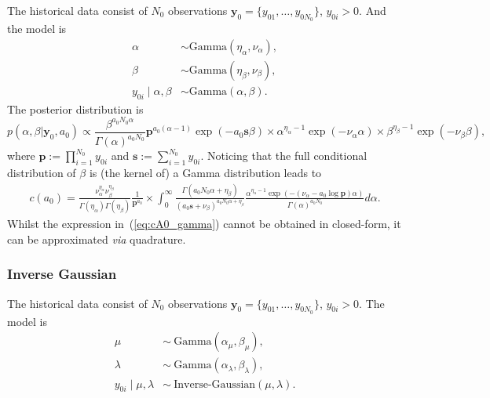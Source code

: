 \documentclass[a4paper, notitlepage, 11pt]{article}
\begin{document}
The historical data consist of $N_0$ observations $\boldsymbol y_0 =\{y_{01}, \ldots , y_{0N_0}\}$, $y_{0i} > 0$.
And the model is
\begin{align*}
 \alpha &\sim \text{Gamma}(\eta_\alpha, \nu_\alpha), \\
 \beta &\sim \text{Gamma}(\eta_\beta, \nu_\beta), \\
 y_{0i} \mid \alpha, \beta &\sim \text{Gamma}(\alpha, \beta).
\end{align*}
The posterior distribution is 
\begin{equation}
 \label{eq:posterior_gamma}
 p(\alpha, \beta | \boldsymbol y_{0}, a_0) \propto \frac{\beta^{a_0N_0\alpha}}{\Gamma(\alpha)^{a_0N_0}} \boldsymbol p^{a_0(\alpha-1)} \exp(-a_0\boldsymbol s\beta) \times  \alpha^{\eta_\alpha -1} \exp(-\nu_\alpha \alpha) \times \beta^{\eta_\beta -1} \exp(-\nu_\beta \beta),
\end{equation}
where $\boldsymbol p := \prod_{i =1}^{N_0} y_{0i}$ and $\boldsymbol s := \sum_{i =1}^{N_0} y_{0i}$.
Noticing that the full conditional distribution of $\beta$ is (the kernel of) a Gamma distribution leads to
\begin{align}
 \label{eq:cA0_gamma}
 c(a_0) = \frac{\nu_\alpha^{\eta_\alpha}\nu_\beta^{\eta_\beta}}{\Gamma(\eta_\alpha)\Gamma(\eta_\beta)} \frac{1}{\boldsymbol p^{a_0} } \times \int_0^\infty \frac{\Gamma(a_0N_0\alpha + \eta_\beta)}{\left( a_0\boldsymbol s + \nu_\beta \right)^{a_0N_0\alpha + \eta_\beta}} \frac{\alpha^{\eta_\alpha -1} \exp(- ( \nu_\alpha - a_0 \log \boldsymbol p) \alpha)}{\Gamma(\alpha)^{a_0 N_0}} d\alpha.
\end{align}
Whilst the expression in~(\ref{eq:cA0_gamma}) cannot be obtained in closed-form, it can be approximated \textit{via} quadrature.


\subsubsection{Inverse Gaussian}
\label{sec:invgaussian_ex}

The historical data consist of $N_0$ observations $\boldsymbol y_0 =\{y_{01}, \ldots , y_{0N_0}\}$, $y_{0i} > 0$.
The model is
\begin{align*}
 \mu & \sim~\text{Gamma}(\alpha_\mu, \beta_\mu),\\
 \lambda & \sim~\text{Gamma}(\alpha_\lambda, \beta_\lambda),\\
 y_{0i} \mid \mu, \lambda &\sim~\text{Inverse-Gaussian}(\mu, \lambda).
\end{align*}
\end{document}
